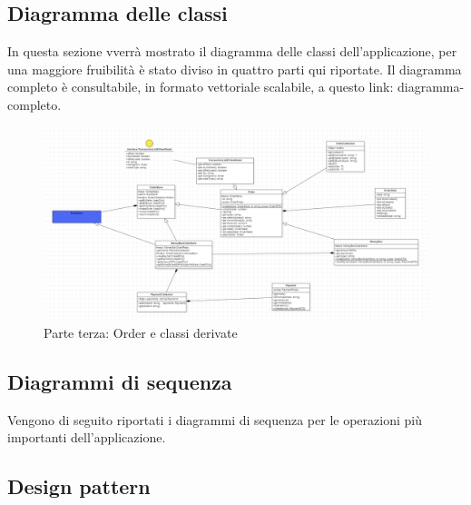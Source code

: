 \subsection{Diagramma delle classi}

In questa sezione vverrà mostrato il diagramma delle classi dell'applicazione, 
per una maggiore fruibilità è stato diviso in quattro parti qui riportate.
Il diagramma completo è consultabile, in formato vettoriale scalabile, a questo link: diagramma-completo. %

\begin{figure}[H]
    \begin{center}
    \includegraphics[width=\textwidth]{immagini/classi_parte_3.png}
    \caption{Parte terza: Order e classi derivate}
    \end{center}
\end{figure}

\subsection{Diagrammi di sequenza}

Vengono di seguito riportati i diagrammi di sequenza per le operazioni più importanti dell'applicazione.

\subsection{Design pattern}



